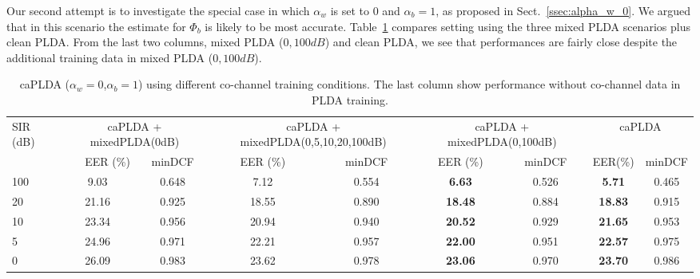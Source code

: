 Our second attempt is to investigate the special case in which $\alpha_w$ is set to $0$ and $\alpha_b=1$, as proposed in Sect.~\ref{ssec:alpha_w_0}. 
We argued that in this scenario the estimate for $\Phi_b$ is likely to be most accurate. 
Table~\ref{tbl:alpha_w_0} compares setting using the three mixed PLDA scenarios plus clean PLDA. 
From the last two columns, mixed PLDA ($0, 100dB$) and clean PLDA, we see that performances are fairly close despite the additional training data in mixed PLDA ($0,100dB$). 

\begin{table}[h!]
	\small
	\centering
	\resizebox{\textwidth}{!}
	{
	\begin{tabular}{|l|c|c|c|c|c|c|c|c|c|c|c|}
		\hline
		\multirow{2}{*}{SIR (dB)} & \multicolumn{3}{c|}{caPLDA + mixedPLDA(0dB)}          & \multicolumn{3}{c|}{caPLDA + mixedPLDA(0,5,10,20,100dB)}  & \multicolumn{3}{c|}{caPLDA + mixedPLDA(0,100dB)}             & \multicolumn{2}{c|}{caPLDA} \\ \cline{2-12} 
		& \multicolumn{2}{r|}{EER (\%)} & minDCF         & \multicolumn{2}{c|}{EER (\%)} & minDCF             & \multicolumn{2}{c|}{EER (\%)}       & minDCF          & EER(\%)               & minDCF       \\ \hline
		100                       & \multicolumn{2}{c|}{9.03}     & 0.648          & \multicolumn{2}{c|}{7.12}     & 0.554              & \multicolumn{2}{c|}{\textbf{6.63}}  & 0.526           & \textbf{5.71}         & 0.465        \\ \hline
		20                        & \multicolumn{2}{c|}{21.16}    & 0.925          & \multicolumn{2}{c|}{18.55}    & 0.890              & \multicolumn{2}{c|}{\textbf{18.48}} & 0.884           & \textbf{18.83}        & 0.915        \\ \hline
		10                        & \multicolumn{2}{c|}{23.34}    & 0.956          & \multicolumn{2}{c|}{20.94}    & 0.940              & \multicolumn{2}{c|}{\textbf{20.52}} & 0.929           & \textbf{21.65}        & 0.953        \\ \hline
		5                         & \multicolumn{2}{c|}{24.96}    & 0.971          & \multicolumn{2}{c|}{22.21}    & 0.957              & \multicolumn{2}{c|}{\textbf{22.00}} & 0.951           & \textbf{22.57}        & 0.975        \\ \hline
		0                         & \multicolumn{2}{c|}{26.09}    & 0.983          & \multicolumn{2}{c|}{23.62}    & 0.978              & \multicolumn{2}{c|}{\textbf{23.06}} & 0.970           & \textbf{23.70}        & 0.986        \\ \hline
	\end{tabular}
	}
	\caption{caPLDA ($\alpha_w=0$,$\alpha_b=1$) using different co-channel training conditions. The last column show performance without co-channel data in PLDA training.}
	\label{tbl:alpha_w_0}
\end{table}



